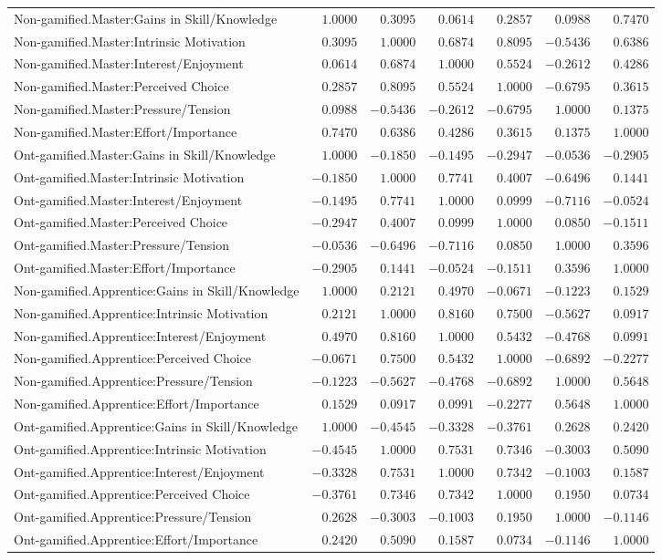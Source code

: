 \begin{landscape}
{\begin{longtable}{lrrrrrr}
Non-gamified.Master:Gains in Skill/Knowledge&$1.0000$&$ 0.3095$&$ 0.0614$&$ 0.2857$&$ 0.0988$&$0.7470$\tabularnewline
Non-gamified.Master:Intrinsic Motivation&$0.3095$&$ 1.0000$&$ 0.6874$&$ 0.8095$&$-0.5436$&$0.6386$\tabularnewline
Non-gamified.Master:Interest/Enjoyment&$0.0614$&$ 0.6874$&$ 1.0000$&$ 0.5524$&$-0.2612$&$0.4286$\tabularnewline
Non-gamified.Master:Perceived Choice&$0.2857$&$ 0.8095$&$ 0.5524$&$ 1.0000$&$-0.6795$&$0.3615$\tabularnewline
Non-gamified.Master:Pressure/Tension&$0.0988$&$-0.5436$&$-0.2612$&$-0.6795$&$ 1.0000$&$0.1375$\tabularnewline
Non-gamified.Master:Effort/Importance&$0.7470$&$ 0.6386$&$ 0.4286$&$ 0.3615$&$ 0.1375$&$1.0000$\tabularnewline
\hline


Ont-gamified.Master:Gains in Skill/Knowledge&$ 1.0000$&$-0.1850$&$-0.1495$&$-0.2947$&$-0.0536$&$-0.2905$\tabularnewline
Ont-gamified.Master:Intrinsic Motivation&$-0.1850$&$ 1.0000$&$ 0.7741$&$ 0.4007$&$-0.6496$&$ 0.1441$\tabularnewline
Ont-gamified.Master:Interest/Enjoyment&$-0.1495$&$ 0.7741$&$ 1.0000$&$ 0.0999$&$-0.7116$&$-0.0524$\tabularnewline
Ont-gamified.Master:Perceived Choice&$-0.2947$&$ 0.4007$&$ 0.0999$&$ 1.0000$&$ 0.0850$&$-0.1511$\tabularnewline
Ont-gamified.Master:Pressure/Tension&$-0.0536$&$-0.6496$&$-0.7116$&$ 0.0850$&$ 1.0000$&$ 0.3596$\tabularnewline
Ont-gamified.Master:Effort/Importance&$-0.2905$&$ 0.1441$&$-0.0524$&$-0.1511$&$ 0.3596$&$ 1.0000$\tabularnewline
\hline
\newpage

Non-gamified.Apprentice:Gains in Skill/Knowledge&$ 1.0000$&$ 0.2121$&$ 0.4970$&$-0.0671$&$-0.1223$&$ 0.1529$\tabularnewline
Non-gamified.Apprentice:Intrinsic Motivation&$ 0.2121$&$ 1.0000$&$ 0.8160$&$ 0.7500$&$-0.5627$&$ 0.0917$\tabularnewline
Non-gamified.Apprentice:Interest/Enjoyment&$ 0.4970$&$ 0.8160$&$ 1.0000$&$ 0.5432$&$-0.4768$&$ 0.0991$\tabularnewline
Non-gamified.Apprentice:Perceived Choice&$-0.0671$&$ 0.7500$&$ 0.5432$&$ 1.0000$&$-0.6892$&$-0.2277$\tabularnewline
Non-gamified.Apprentice:Pressure/Tension&$-0.1223$&$-0.5627$&$-0.4768$&$-0.6892$&$ 1.0000$&$ 0.5648$\tabularnewline
Non-gamified.Apprentice:Effort/Importance&$ 0.1529$&$ 0.0917$&$ 0.0991$&$-0.2277$&$ 0.5648$&$ 1.0000$\tabularnewline
\hline


Ont-gamified.Apprentice:Gains in Skill/Knowledge&$ 1.0000$&$-0.4545$&$-0.3328$&$-0.3761$&$ 0.2628$&$ 0.2420$\tabularnewline
Ont-gamified.Apprentice:Intrinsic Motivation&$-0.4545$&$ 1.0000$&$ 0.7531$&$ 0.7346$&$-0.3003$&$ 0.5090$\tabularnewline
Ont-gamified.Apprentice:Interest/Enjoyment&$-0.3328$&$ 0.7531$&$ 1.0000$&$ 0.7342$&$-0.1003$&$ 0.1587$\tabularnewline
Ont-gamified.Apprentice:Perceived Choice&$-0.3761$&$ 0.7346$&$ 0.7342$&$ 1.0000$&$ 0.1950$&$ 0.0734$\tabularnewline
Ont-gamified.Apprentice:Pressure/Tension&$ 0.2628$&$-0.3003$&$-0.1003$&$ 0.1950$&$ 1.0000$&$-0.1146$\tabularnewline
Ont-gamified.Apprentice:Effort/Importance&$ 0.2420$&$ 0.5090$&$ 0.1587$&$ 0.0734$&$-0.1146$&$ 1.0000$\tabularnewline
\hline


\end{longtable}}\end{landscape}


